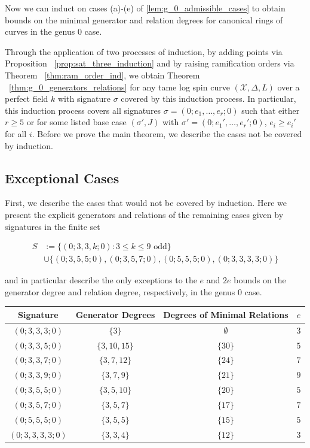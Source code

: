 \documentclass{amsart}
\theoremstyle{plain}
\theoremstyle{definition}
\theoremstyle{remark}
\numberwithin{equation}{section}
\newcommand\ssec{\subsection}
\newcommand \sx{\mathscr X}
\begin{document}
Now we can induct on cases (a)-(e) of \ref{lem:g_0_admissible_cases}
to obtain bounds on the minimal generator and relation degrees for
canonical rings of curves in the genus 0 case.

Through the application of two processes of induction, by adding 
points via Proposition ~\ref{prop:sat_three_induction} and by raising
ramification orders via Theorem ~\ref{thm:ram_order_ind},
we obtain Theorem ~\ref{thm:g_0_generators_relations} for any tame
log spin curve $(\sx, \Delta, L)$ over a perfect field $k$ with
signature $\sigma$ covered by this induction process.
In particular, this induction process covers all signatures $\sigma
= (0; e_1, \ldots, e_r; 0)$ such that either $r \geq 5$ or
for some listed base case $(\sigma', J)$ with $\sigma' = (0; e_1',
\ldots, e_r'; 0)$, $e_i \geq e_i'$ for all $i$.
Before we prove the main theorem, we describe the cases not be
covered by induction.

\ssec{Exceptional Cases}
\label{ssec:g_0_exceptional}
First, we describe the cases that would not be covered by induction.
Here we present the explicit generators and relations of the remaining
cases given by signatures in the finite set

\begin{align*}
	S &:= \{(0; 3, 3, k; 0) : 3 \leq k \leq 9 \text{ odd}\} \\
		&\cup \{(0; 3, 5, 5; 0) ,(0; 3, 5, 7; 0), (0; 5, 5, 5; 0), (0; 3, 3, 3, 3; 0)\}
\end{align*}

\noindent
and in particular describe the only exceptions to the $e$ and $2e$
bounds on the generator degree and relation degree, respectively,
in the genus 0 case.

\begin{longtable}
	{| c || c | c | c |}
	\hline
	Signature & Generator Degrees & Degrees of Minimal Relations & $e$ \\
	\hline
	\hline

	$(0; 3, 3, 3; 0)$ & $\{3\}$ & $\emptyset$ & $3$ \\	\hline

	$(0; 3, 3, 5; 0)$ & $\{3, 10, 15\}$ & $\{30\}$ & $5$ \\	\hline
	
	$(0; 3, 3, 7; 0)$ & $\{3, 7, 12\}$ & $\{24\}$ & $7$ \\	\hline
	
	$(0; 3, 3, 9; 0)$ & $\{3, 7, 9\}$ & $\{21\}$ & $9$ \\	\hline
	
	$(0; 3, 5, 5; 0)$ & $\{3, 5, 10\}$ & $\{20\}$ & $5$ \\	\hline
	
	$(0; 3, 5, 7; 0)$ & $\{3, 5, 7\}$ & $\{17\}$ & $7$ \\	\hline
	
	$(0; 5, 5, 5; 0)$ & $\{3, 5, 5\}$ & $\{15\}$ & $5$ \\	\hline
	
	$(0; 3, 3, 3, 3; 0)$ & $\{3, 3, 4\}$ & $\{12\}$ & $3$ \\	\hline
\end{longtable}
\end{document}
